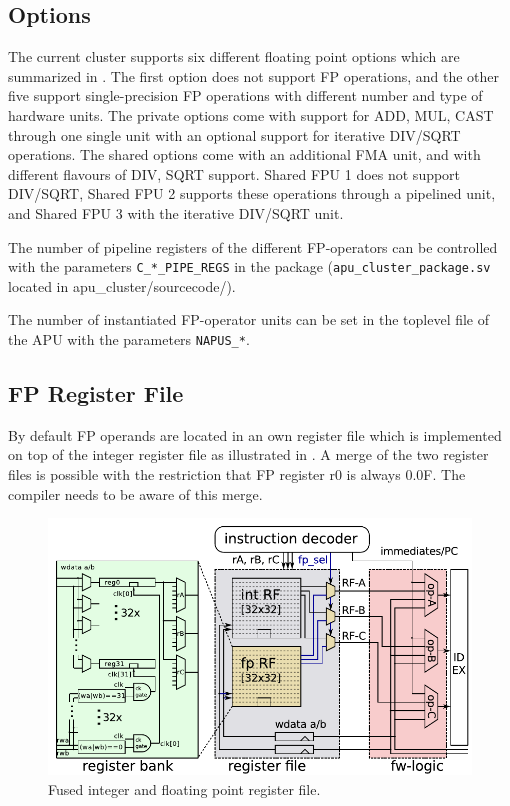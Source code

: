 \documentclass[%
 oneside,      %
 openany,      %
 halfparskip,  %
]{scrbook}
\begin{document}
\subsection{Options}
The current cluster supports six different floating point options which are summarized in . The first option does not support FP operations, and the other five support single-precision FP operations with different number and type of hardware units. The private options come with support for ADD, MUL, CAST through one single unit with an optional support for iterative DIV/SQRT operations. The shared options come with an additional FMA unit, and with different flavours of DIV, SQRT support. Shared FPU 1 does not support DIV/SQRT, Shared FPU 2 supports these operations through a pipelined unit, and Shared FPU 3 with the iterative DIV/SQRT unit.

The number of pipeline registers of the different FP-operators can be controlled with the parameters \texttt{C\_*\_PIPE\_REGS} in the package (\texttt{apu\_cluster\_package.sv} located in apu\_cluster/sourcecode/).

The number of instantiated FP-operator units can be set in the toplevel file of the APU with the parameters \texttt{NAPUS\_*}.



\subsection{FP Register File}

By default FP operands are located in an own register file which is implemented on top of the integer register file as illustrated in . A merge of the two register files is possible with the restriction that FP register r0 is always 0.0F. The compiler needs to be aware of this merge.

\begin{figure}[tb]
\centering
  \includegraphics[width=0.95\linewidth]{figures/rf_fpu.pdf}
  \caption{Fused integer and floating point register file.}
  \label{fig_apu:regfile}
\end{figure}
\end{document}
